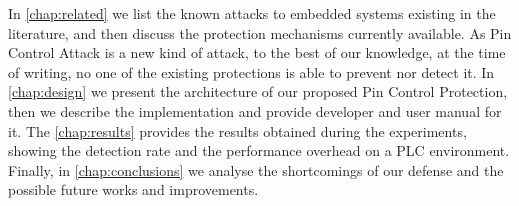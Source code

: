 In \chap \ref{chap:related} we list the known attacks to embedded systems existing in the literature, and then discuss the protection mechanisms currently available.
As Pin Control Attack is a new kind of attack, to the best of our knowledge, at the time of writing, no one of the existing protections is able to prevent nor detect it.
In \chap \ref{chap:design} we present the architecture of our proposed Pin Control Protection, then we describe the implementation and provide developer and user manual for it.
The \chap \ref{chap:results} provides the results obtained during the experiments, showing the detection rate and the performance overhead on a PLC environment.
Finally, in \chap \ref{chap:conclusions} we analyse the shortcomings of our defense and the possible future works and improvements.
